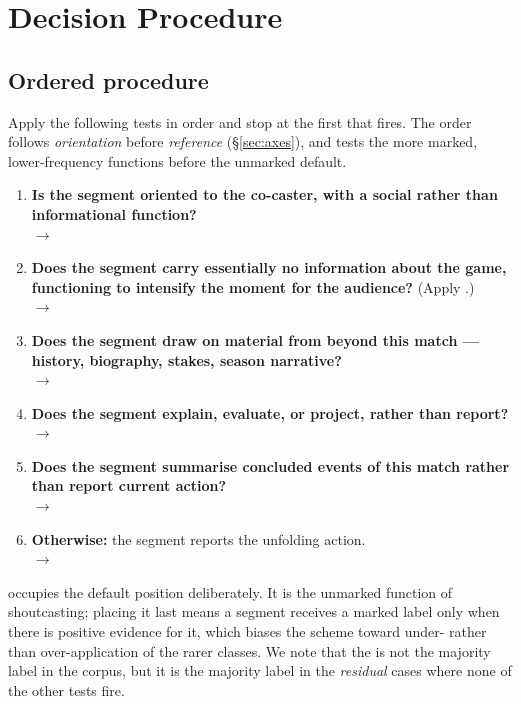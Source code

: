 \section{Decision Procedure}
\label{sec:tree}

\subsection{Ordered procedure}

Apply the following tests in order and stop at the first that fires. The order follows \emph{orientation} before \emph{reference} (\S\ref{sec:axes}), and tests the more marked, lower-frequency functions before the unmarked default.

\begin{agrulebox}
\begin{enumerate}[leftmargin=2.2em]
  \item \textbf{Is the segment oriented to the co-caster, with a social
    rather than informational function?} \\ $\rightarrow$ \BAN{}
  \item \textbf{Does the segment carry essentially no information about
    the game, functioning to intensify the moment for the audience?}
    (Apply .) \\ $\rightarrow$ \HYP{}
  \item \textbf{Does the segment draw on material from beyond this
    match --- history, biography, stakes, season narrative?} \\
    $\rightarrow$ \STO{}
  \item \textbf{Does the segment explain, evaluate, or project, rather
    than report?} \\ $\rightarrow$ \SA{}
  \item \textbf{Does the segment summarise concluded events of this
    match rather than report current action?} \\ $\rightarrow$ \REC{}
  \item \textbf{Otherwise:} the segment reports the unfolding action.
    \\ $\rightarrow$ \PBP{}
\end{enumerate}
\end{agrulebox}

\noindent \PBP{} occupies the default position deliberately. It is the
unmarked function of shoutcasting; placing it last means a segment receives a marked label only when there is positive evidence for it, which biases the scheme toward under- rather than over-application of the rarer classes. We note that the \PBP{} is not the majority label in the corpus, but it is the majority label in the \emph{residual} cases where none of the other tests fire.

